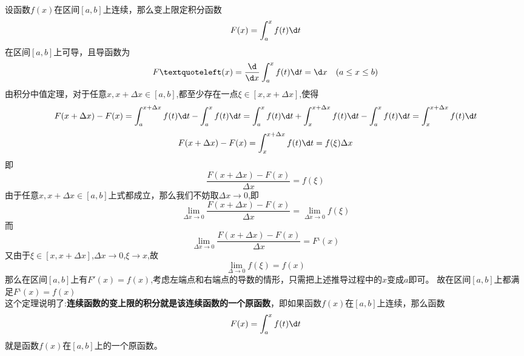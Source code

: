 \sj
\theorem[变上限定积分函数的性质]
设函数$f(x)$在区间$[a,b]$上连续，那么变上限定积分函数
\begin{equation}
	\nonumber
	F(x)=\int_{a}^{x}f(t)\d t
\end{equation}
在区间$[a,b]$上可导，且导函数为
\begin{equation}
	\nonumber
	F‘(x)=\frac{\d}{\d x}\int_{a}^{x}f(t)\d t=\d x  \hspace{1em}(a\leq x\leq b)
\end{equation}
\proof 由积分中值定理，对于任意$x,x+\Delta x\in[a,b]$,都至少存在一点$\xi\in[x,x+\Delta x]$,使得\sj
\begin{equation}
	\nonumber
	F(x+\Delta x)-F(x)=\int_{a}^{x+\Delta x}f(t)\d t-\int_{a}^{x}f(t)\d t=\int_{a}^{x}f(t)\d t+\int_{x}^{x+\Delta x}f(t)\d t-\int_{a}^{x}f(t)\d t=\int_{x}^{x+\Delta x}f(t)\d t
\end{equation}
\begin{equation}
	\nonumber
	F(x+\Delta x)-F(x)=\int_{x}^{x+\Delta x}f(t)\d t=f(\xi)\Delta x
\end{equation}
即
\begin{equation}
	\nonumber
	\frac{F(x+\Delta x)-F(x)}{\Delta x}=f(\xi)
\end{equation}
由于任意$x,x+\Delta x\in[a,b]$上式都成立，那么我们不妨取$\Delta x\to 0$,即
\begin{equation}
	\nonumber
	\lim\limits_{\Delta x\to 0}	\frac{F(x+\Delta x)-F(x)}{\Delta x}=	\lim\limits_{\Delta x \to 0}f(\xi)
	\end{equation}
而
\begin{equation}
	\nonumber
	\lim\limits_{\Delta x\to 0}	\frac{F(x+\Delta x)-F(x)}{\Delta x}=F‘(x)
\end{equation}
又由于$\xi\in[x,x+\Delta x]$,$\Delta x\to0$,$\xi\to x$,故
\begin{equation}
	\nonumber
	\lim\limits_{\Delta\to 0}f(\xi)=f(x)
\end{equation}
那么在区间$[a,b]$上有$F'(x)=f(x)$,考虑左端点和右端点的导数的情形，只需把上述推导过程中的$x$变成$a$即可。
故在区间$[a,b]$上都满足$F‘(x)=f(x)$
\\
这个定理说明了:\textbf{连续函数的变上限的积分就是该连续函数的一个原函数}，即如果函数$f(x)$在$[a,b]$上连续，那么函数
\begin{equation}
	\nonumber
F(x)=\int_{a}^{x}f(t)\d t
\end{equation}
就是函数$f(x)$在$[a,b]$上的一个原函数。